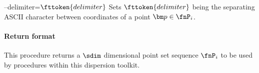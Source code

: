 \begin{procarg}{--delimiter=$\fttoken{delimiter}$}
  Sets $\fttoken{delimiter}$ being the separating ASCII character between coordinates of a point $\bm p \in \fnP_i$.
\end{procarg}


\procargsilent

\paragraph{Return format}

This procedure returns a $\sdim$ dimensional point set sequence $\fnP_i$ to be used by procedures within this dispersion toolkit.
